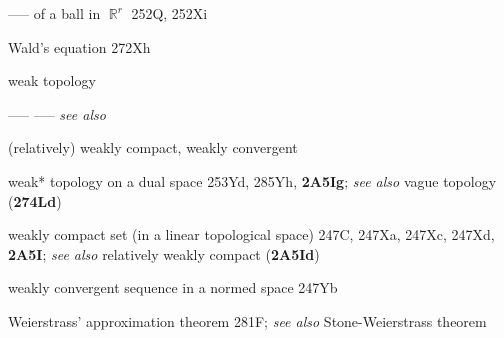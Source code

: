 ----- of a ball in $\BbbR^r$ 252Q, 252Xi



\indexmedskip

Wald's equation 272Xh




















{weak topology }





----- ----- {\it see also}
 
(relatively) weakly compact, 
weakly convergent 




weak* topology on a dual space 253Yd, 285Yh, {\bf 2A5Ig}; 
  {\it see also} vague topology ({\bf 274Ld})









weakly compact set (in a linear topological space) 247C, 247Xa,
247Xc, 247Xd, {\bf 2A5I}; 
  {\it see also}
relatively weakly compact ({\bf 2A5Id})




weakly convergent sequence in a normed space 247Yb



































Weierstrass' approximation theorem 281F;
  {\it see also} Stone-Weierstrass theorem





